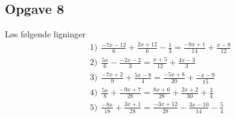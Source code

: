 \subsection*{Opgave 8}
Løs følgende ligninger
\begin{align*}
	&1) \ \ \frac{-7x-12}{6} + \frac{2x + 12}{6} - \frac{1}{3} = \frac{-8x + 1}{14} + \frac{x-9}{12} \\
	&2) \ \ \frac{5x}{6} - \frac{-2x-2}{3} = \frac{x + 5}{12} + \frac{4x - 3}{3} \\
	&3) \ \ \frac{-7x + 2}{9} + \frac{5x-8}{4} = \frac{-5x + 8}{20} + \frac{-x - 9}{15} \\
	&4) \ \ \frac{5x}{8} + \frac{-9x+7}{28} = \frac{8x + 6}{28} + \frac{2x + 2}{30} + \frac{3}{4} \\
	&5) \ \ \frac{-8x}{18} + \frac{3x + 1}{28} = \frac{-3x + 12}{28} - \frac{3x-10}{14} - \frac{5}{4} \\
\end{align*}
